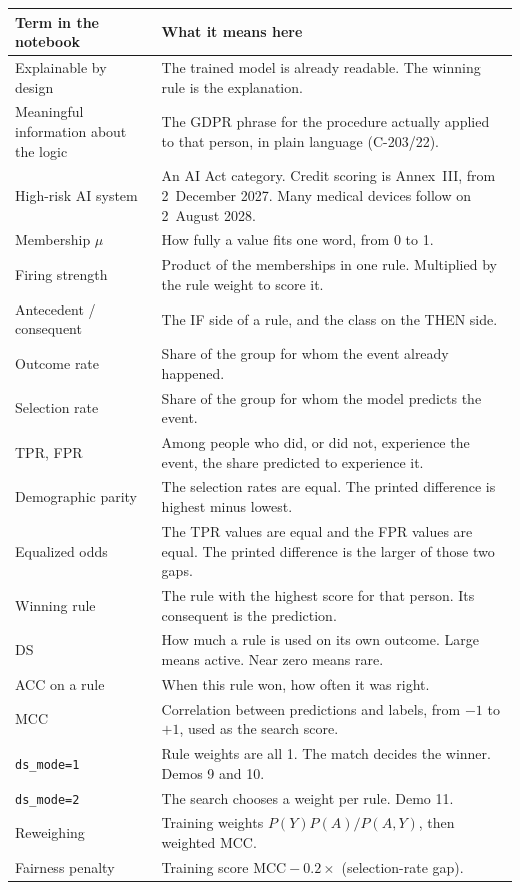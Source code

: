 \documentclass[11pt]{article}
\newcommand{\fn}[1]{\texttt{\small #1}}
\begin{document}
\begin{table}[H]
\centering
\small
\begin{tabularx}{\textwidth}{@{}l Y@{}}
\toprule
Term in the notebook & What it means here \\
\midrule
Explainable by design & The trained model is already readable. The winning rule is the explanation. \\
Meaningful information about the logic & The GDPR phrase for the procedure actually applied to that person, in plain language (C-203/22). \\
High-risk AI system & An AI Act category. Credit scoring is Annex~III, from 2~December 2027. Many medical devices follow on 2~August 2028. \\
Membership \(\mu\) & How fully a value fits one word, from 0 to 1. \\
Firing strength & Product of the memberships in one rule. Multiplied by the rule weight to score it. \\
Antecedent / consequent & The IF side of a rule, and the class on the THEN side. \\
Outcome rate & Share of the group for whom the event already happened. \\
Selection rate & Share of the group for whom the model predicts the event. \\
TPR, FPR & Among people who did, or did not, experience the event, the share predicted to experience it. \\
Demographic parity & The selection rates are equal. The printed difference is highest minus lowest. \\
Equalized odds & The TPR values are equal and the FPR values are equal. The printed difference is the larger of those two gaps. \\
Winning rule & The rule with the highest score for that person. Its consequent is the prediction. \\
DS & How much a rule is used on its own outcome. Large means active. Near zero means rare. \\
ACC on a rule & When this rule won, how often it was right. \\
MCC & Correlation between predictions and labels, from \(-1\) to \(+1\), used as the search score. \\
\fn{ds\_mode=1} & Rule weights are all 1. The match decides the winner. Demos 9 and 10. \\
\fn{ds\_mode=2} & The search chooses a weight per rule. Demo 11. \\
Reweighing & Training weights \(P(Y)P(A)/P(A,Y)\), then weighted MCC. \\
Fairness penalty & Training score \(\mathrm{MCC} - 0.2 \times\) (selection-rate gap). \\
\bottomrule
\end{tabularx}
\end{table}
\end{document}
